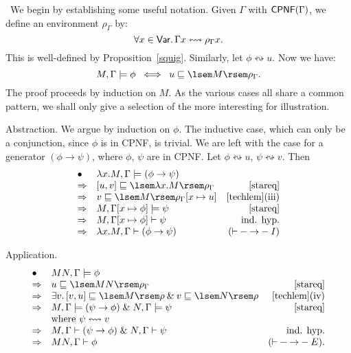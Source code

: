 \proof\ We begin by establishing some useful notation.
Given $\Gamma$ with ${\sf CPNF}(\Gamma )$, we define an environment $\rho_{\Gamma}$ by:
\[ \forall x \in {\sf Var}. \, \Gamma x \leftrightsquigarrow \rho_{\Gamma} x . \]
This is well-defined by Proposition~\ref{squig}.
Similarly, let $\phi \leftrightsquigarrow u$.
Now we have:
\begin{equation}
\label{stareq}
M, \Gamma \models \phi \;\; \Longleftrightarrow \;\; u \sqsubseteq \lsem M \rsem \rho_{\Gamma} . 
\end{equation}
The proof proceeds by induction on $M$.
As the various cases all share a common pattern, we shall only give a selection of the more interesting for illustration.

Abstraction. We argue by induction on $\phi$. 
The inductive case, which can only be a conjunction, since
$\phi$ is in {\sf CPNF}, is trivial.
We are left with the case for a generator $(\phi \rightarrow \psi )$, where $\phi$, $\psi$ are in {\sf CPNF}.
Let $\phi \leftrightsquigarrow u$, $\psi \leftrightsquigarrow v$.
Then
\[ \begin{array}{llr}
\bullet & \lambda x . M, \Gamma \models (\phi \rightarrow \psi ) & \\
\Rightarrow & [u, v] \sqsubseteq \lsem \lambda x . M \rsem \rho_{\Gamma} & \ref{stareq} \\
\Rightarrow & v \sqsubseteq \lsem M \rsem \rho_{\Gamma}[x \mapsto u] & \mbox{\ref{techlem}(iii)} \\
\Rightarrow & M, \Gamma [x \mapsto \phi ] \models \psi & \ref{stareq} \\
\Rightarrow & M, \Gamma [x \mapsto \phi ] \vdash \psi & \mbox{ind. hyp.} \\
\Rightarrow & \lambda x . M, \Gamma \vdash (\phi \rightarrow \psi ) & ({\vdash}-{\rightarrow}-I)
\end{array} \]

Application.
\[ \begin{array}{llr}
\bullet & MN, \Gamma \models \phi  &\\
\Rightarrow & u \sqsubseteq \lsem MN \rsem \rho_{\Gamma} & \ref{stareq} \\
\Rightarrow & \exists v. \, [v, u] \sqsubseteq \lsem M \rsem \rho \: \& \: v \sqsubseteq \lsem N \rsem \rho & \mbox{\ref{techlem}(iv)} \\
\Rightarrow & M, \Gamma \models (\psi \rightarrow \phi ) \; \& \; N, \Gamma \models \psi & \ref{stareq} \\
& \mbox{where $\psi \leftrightsquigarrow v$} & \\
\Rightarrow & M, \Gamma \vdash (\psi \rightarrow \phi ) \; \& \; N, \Gamma \vdash \psi & \mbox{ind. hyp.} \\
\Rightarrow & MN, \Gamma \vdash \phi & ({\vdash}-{\rightarrow}-E).
\end{array} \]

